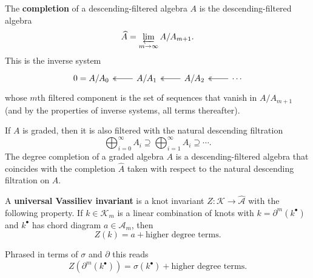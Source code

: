 \begin{definition}
	The \textbf{completion} of a descending-filtered algebra \(A\) is the descending-filtered algebra
	\[\widehat{A} = \varprojlim_{m \to \infty} A / A_{m + 1}.\]
	This is the inverse system
	\[\begin{tikzcd}
		{0 = A/A_{0}} & {A/A_{1}} & {A/A_{2}} & \cdots
		\arrow[two heads, from=1-2, to=1-1]
		\arrow[two heads, from=1-3, to=1-2]
		\arrow[two heads, from=1-4, to=1-3]
	\end{tikzcd}\]
	whose \(m\)th filtered component is the set of sequences that vanish in \(A/A_{m + 1}\) (and by the properties of inverse systems, all terms thereafter).
\end{definition}

If \(A\) is graded, then it is also filtered with the natural descending filtration
\[\bigoplus_{i = 0}^{\infty} A_{i} \supseteq \bigoplus_{i = 1}^{\infty} A_{i} \supseteq \cdots.\]
The degree completion of a graded algebra \(A\) is a descending-filtered algebra that coincides with the completion \(\widehat{A}\) taken with respect to the natural descending filtration on \(A\).

\begin{definition}
	\label{def:universal-vassiliev-invariant}
	A \textbf{universal Vassiliev invariant} is a knot invariant \(Z : \mathcal{K} \to \widehat{\mathcal{A}}\) with the following property. If \(k \in \mathcal{K}_{m}\) is a linear combination of knots with \(k = \partial^{m}(k^{\bullet})\) and \(k^{\bullet}\) has chord diagram \(a \in \mathcal{A}_{m}\), then
	\[Z(k) = a + \text{higher degree terms.}\]

	Phrased in terms of \(\sigma\) and \(\partial\) this reads
	\[Z(\partial^{m}(k^{\bullet})) = \sigma(k^{\bullet}) + \text{higher degree terms.}\]
\end{definition}

